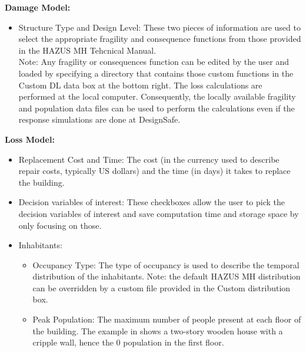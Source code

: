\textbf{Damage Model:}

\begin{itemize}
	\item Structure Type and Design Level: These two pieces of information are used to select the appropriate fragility and consequence functions from those provided in the HAZUS MH Tehcnical Manual.\\
	Note: Any fragility or consequences function can be edited by the user and loaded by specifying a directory that contains those custom functions in the Custom DL data box at the bottom right. The loss calculations are performed at the local computer. Consequently, the locally available fragility and population data files can be used to perform the calculations even if the response simulations are done at DesignSafe.
\end{itemize}

\textbf{Loss Model:}

\begin{itemize}
	\item Replacement Cost and Time: The cost (in the currency used to describe repair costs, typically US dollars) and the time (in days) it takes to replace the building.
	\item Decision variables of interest: These checkboxes allow the user to pick the decision variables of interest and save computation time and storage space by only focusing on those.
	\item Inhabitants:
	\begin{itemize}
		\item Occupancy Type: The type of occupancy is used to describe the temporal distribution of the inhabitants. Note: the default HAZUS MH distribution can be overridden by a custom file provided in the Custom distribution box.
		\item Peak Population: The maximum number of people present at each floor of the building. The example in  shows a two-story wooden house with a cripple wall, hence the 0 population in the first floor.
	\end{itemize}
\end{itemize}